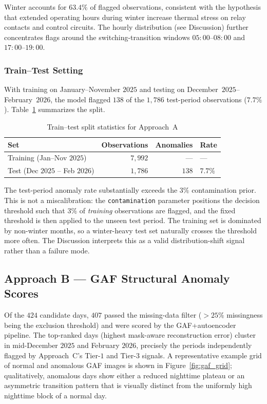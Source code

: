 \documentclass[11pt]{article}
\begin{document}
\begin{enumerate}[leftmargin=1.5em,itemsep=1pt]
Winter accounts for $63.4\%$ of flagged observations, consistent with the hypothesis that extended operating hours during winter increase thermal stress on relay contacts and control circuits. The hourly distribution (see Discussion) further concentrates flags around the switching-transition windows $05{:}00$--$08{:}00$ and $17{:}00$--$19{:}00$.

\subsubsection*{Train--Test Setting}
With training on January--November $2025$ and testing on December~$2025$--February~$2026$, the model flagged $138$ of the $1{,}786$ test-period observations ($7.7\%$). Table~\ref{tab:split} summarizes the split.

\begin{table}[H]
\centering
\caption{Train--test split statistics for Approach~A}
\label{tab:split}
\begin{tabular}{lrrl}
\toprule
\textbf{Set} & \textbf{Observations} & \textbf{Anomalies} & \textbf{Rate}\\
\midrule
Training (Jan--Nov $2025$) & $7{,}992$ & --- & ---\\
Test     (Dec $2025$ -- Feb $2026$) & $1{,}786$ & $138$ & $7.7\%$\\
\bottomrule
\end{tabular}
\end{table}

The test-period anomaly rate substantially exceeds the $3\%$ contamination prior. This is not a miscalibration: the \texttt{contamination} parameter positions the decision threshold such that $3\%$ of \emph{training} observations are flagged, and the fixed threshold is then applied to the unseen test period. The training set is dominated by non-winter months, so a winter-heavy test set naturally crosses the threshold more often. The Discussion interprets this as a valid distribution-shift signal rather than a failure mode.

\subsection{Approach B --- GAF Structural Anomaly Scores}
Of the $424$ candidate days, $407$ passed the missing-data filter ($>25\%$ missingness being the exclusion threshold) and were scored by the GAF+autoencoder pipeline. The top-ranked days (highest mask-aware reconstruction error) cluster in mid-December $2025$ and February $2026$, precisely the periods independently flagged by Approach~C's Tier-$1$ and Tier-$3$ signals. A representative example grid of normal and anomalous GAF images is shown in Figure~\ref{fig:gaf_grid}; qualitatively, anomalous days show either a reduced nighttime plateau or an asymmetric transition pattern that is visually distinct from the uniformly high nighttime block of a normal day.


\end{enumerate}
\end{document}
